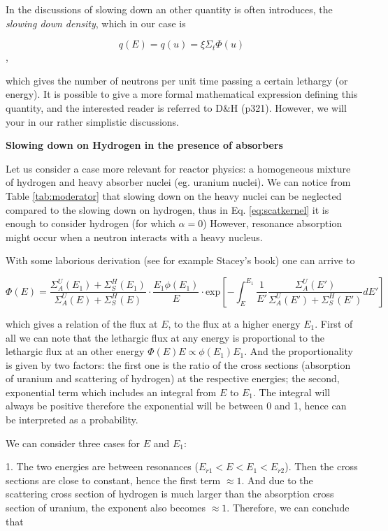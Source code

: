 In the discussions of slowing down an other quantity is often introduces, the \textit{slowing down density}, which in our case is

$$q(E)=q(u)=\xi\Sigma_t\Phi(u)$$,

which gives the number of neutrons per unit time passing a certain lethargy (or energy). It is possible to give a more formal mathematical expression defining this quantity, and the interested reader is referred to D\&H (p321). However, we will your in our rather simplistic discussions.


\vspace{0.5cm}

\textbf{Slowing down on Hydrogen in the presence of absorbers}

Let us consider a case more relevant for reactor physics: a homogeneous mixture of hydrogen and heavy absorber nuclei (eg. uranium nuclei). We can notice from Table \ref{tab:moderator} that slowing down on the heavy nuclei can be neglected compared to the slowing down on hydrogen, thus in Eq. \eqref{eq:scatkernel} it is enough to consider hydrogen (for which $\alpha=0$) However, resonance absorption might occur when a neutron interacts with a heavy nucleus. 

With some laborious derivation (see for example Stacey's book) one can arrive to

\begin{equation}\label{eq:slowingdownHU}
 \Phi(E) = \frac{\Sigma_A^U(E_1) + \Sigma_S^H(E_1)}{ \Sigma_A^U(E) + \Sigma_S^H(E)} \cdot \frac{E_1\phi(E_1)}{E} \cdot \mathrm{exp}\left[-\int_E^{E_1} \frac{1}{E'} \frac{\Sigma_A^U(E')}{\Sigma_A^U(E') + \Sigma_S^H(E')}dE'\right]
\end{equation}

\noindent which gives a relation of the flux at $E$, to the flux at a higher energy $E_1$. First of all we can note that the lethargic flux at any energy is proportional to the lethargic flux at an other energy $\Phi(E)E \propto \phi(E_1)E_1$. And the proportionality is given by two factors: the first one is the ratio of the cross sections (absorption of uranium and scattering of hydrogen) at the respective energies; the second, exponential term which includes an integral from $E$ to $E_1$. The integral will always be positive therefore the exponential will be between 0 and 1, hence can be interpreted as a probability. 

We can consider three cases for $E$ and $E_1$:

1. The two energies are between resonances ($E_{r1}<E<E_1<E_{r2}$). Then the cross sections are close to constant, hence the first term $\approx 1$. And due to the scattering cross section of hydrogen is much larger than the absorption cross section of uranium, the exponent also becomes $\approx 1$. Therefore, we can conclude that  

